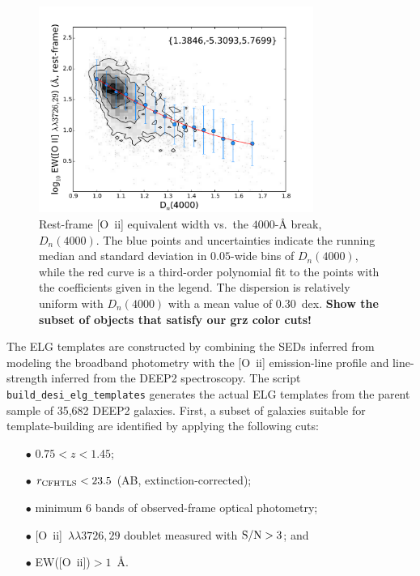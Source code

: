 \documentclass[11pt]{article}
\newcommand{\oii}{[O~{\sc ii}]}
\newcommand{\oiilam}{[O~{\sc ii}]~\ensuremath{\lambda\lambda3726,29}}
\begin{document}
\begin{figure}
\centering
\includegraphics[width=0.8\textwidth]{figures/d4000_ewoii.pdf}
\caption{Rest-frame \oii{} equivalent width vs.~the $4000$-\AA{}
  break, $D_{n}(4000)$.  The blue points and uncertainties indicate
  the running median and standard deviation in $0.05$-wide bins of
  $D_{n}(4000)$, while the red curve is a third-order polynomial fit
  to the points with the coefficients given in the
  legend.  The dispersion is relatively uniform with $D_{n}(4000)$
  with a mean value of $0.30$~dex.  {\bf Show the subset of objects
    that satisfy our grz color cuts!}  \label{fig:d4000}}
\end{figure}

\vspace{1in}

The ELG templates are constructed by combining the SEDs inferred from
modeling the broadband photometry with the \oii{} emission-line
profile and line-strength inferred from the DEEP2 spectroscopy.  The
script {\tt build\_desi\_elg\_templates} generates the actual ELG
templates from the parent sample of 35,682 DEEP2 galaxies.  First, a
subset of galaxies suitable for template-building are identified by
applying the following cuts:

\begin{enumerate}
\item[$\bullet$]{$0.75<z<1.45$;}
\item[$\bullet$]{$r_{\rm CFHTLS}<23.5$ (AB, extinction-corrected);}
\item[$\bullet$]{minimum 6 bands of observed-frame optical photometry;}
\item[$\bullet$]{\oiilam{} doublet measured with ${\rm S/N}>3$; and}
\item[$\bullet$]{EW(\oii)$>1$~\AA.}
\end{enumerate}
\end{document}
